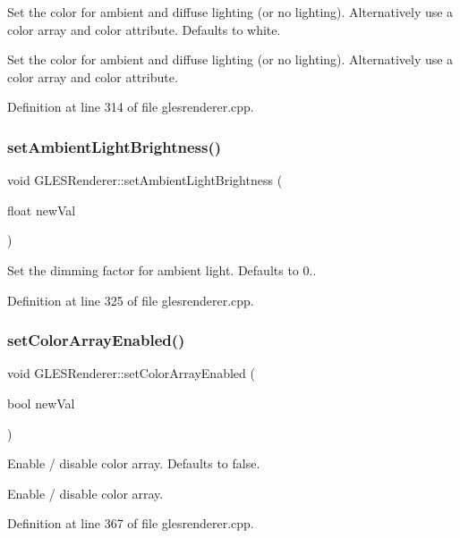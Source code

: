 Set the color for ambient and diffuse lighting (or no lighting). Alternatively use a color array and color attribute. Defaults to white.

Set the color for ambient and diffuse lighting (or no lighting). Alternatively use a color array and color attribute. 

Definition at line 314 of file glesrenderer.\+cpp.

\mbox{\label{class_g_l_e_s_renderer_a0173737627f25d5a0586a57569c211d2}} 
\subsubsection{\texorpdfstring{setAmbientLightBrightness()}{setAmbientLightBrightness()}}
{\footnotesize\ttfamily void G\+L\+E\+S\+Renderer\+::set\+Ambient\+Light\+Brightness (\begin{DoxyParamCaption}\item[{float}]{new\+Val }\end{DoxyParamCaption})}

Set the dimming factor for ambient light. Defaults to 0.. 

Definition at line 325 of file glesrenderer.\+cpp.

\mbox{\label{class_g_l_e_s_renderer_a990ae5bda053d007a710e7e9956facf1}} 
\subsubsection{\texorpdfstring{setColorArrayEnabled()}{setColorArrayEnabled()}}
{\footnotesize\ttfamily void G\+L\+E\+S\+Renderer\+::set\+Color\+Array\+Enabled (\begin{DoxyParamCaption}\item[{bool}]{new\+Val }\end{DoxyParamCaption})}

Enable / disable color array. Defaults to false.

Enable / disable color array. 

Definition at line 367 of file glesrenderer.\+cpp.

